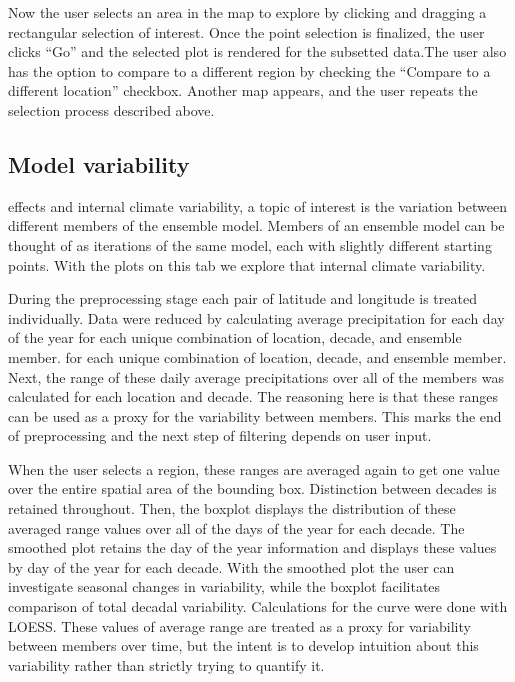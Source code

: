 \documentclass[10pt,letterpaper]{article}
\begin{document}
Now the user selects an area in the map to explore by clicking and dragging a rectangular selection of interest. Once the point selection is finalized, the user clicks “Go” and the selected plot is rendered for the subsetted data.The user also has the option to compare to a different region by checking the “Compare to a different location” checkbox. Another map appears, and the user repeats the selection process described above.




\subsection*{Model variability}

effects and internal climate variability, a topic of interest is the variation between different members of the ensemble model. Members of an ensemble model can be thought of as iterations of the same model, each with slightly different starting points. With the plots on this tab we explore that internal climate variability.

During the preprocessing stage each pair of latitude and longitude is treated individually. Data were reduced by calculating average precipitation for each day of the year for each unique combination of location, decade, and ensemble member. for each unique combination of location, decade, and ensemble member. Next, the range of these daily average precipitations over all of the members was calculated for each location and decade. The reasoning here is that these ranges can be used as a proxy for the variability between members. This marks the end of preprocessing and the next step of filtering depends on user input.

When the user selects a region, these ranges are averaged again to get one value over the entire spatial area of the bounding box. Distinction between decades is retained throughout. Then, the boxplot displays the distribution of these averaged range values over all of the days of the year for each decade. The smoothed plot retains the day of the year information and displays these values by day of the year for each decade. With the smoothed plot the user can investigate seasonal changes in variability, while the boxplot facilitates comparison of total decadal variability. Calculations for the curve were done with LOESS\cite{cleveland1988locally}. These values of average range are treated as a proxy for variability between members over time, but the intent is to develop intuition about this variability rather than strictly trying to quantify it.
\end{document}
